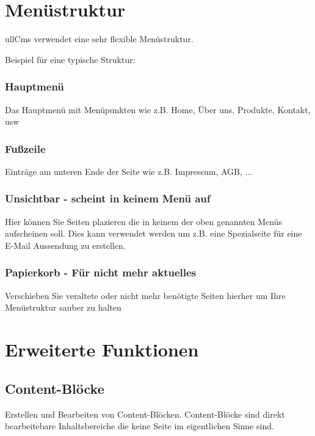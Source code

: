 \documentclass[article, a4paper, oneside, 11pt]{memoir}
\begin{document}
\section{Menüstruktur}

ullCms verwendet eine sehr flexible Menüstruktur. 

Beispiel für eine typische Struktur:

\subsubsection{Hauptmenü}

Das Hauptmenü mit Menüpunkten wie z.B. Home, Über uns, Produkte, Kontakt, usw


\subsubsection{Fußzeile}

Einträge am unteren Ende der Seite wie z.B. Impressum, AGB, ...

\subsubsection{Unsichtbar - scheint in keinem Menü auf}

Hier können Sie Seiten plazieren die in keinem der oben genannten Menüs aufscheinen soll. Dies kann verwendet werden um z.B. eine Spezialseite für eine E-Mail Aussendung zu erstellen.

\subsubsection{Papierkorb - Für nicht mehr aktuelles}

Verschieben Sie veraltete oder nicht mehr benötigte Seiten hierher um Ihre Menüstruktur sauber zu halten

\section{Erweiterte Funktionen}

\subsection{Content-Blöcke}
\label{sec:contentblock}

Erstellen und Bearbeiten von Content-Blöcken. Content-Blöcke sind direkt bearbeitebare Inhaltsbereiche die keine Seite im eigentlichen Sinne sind.
\end{document}
